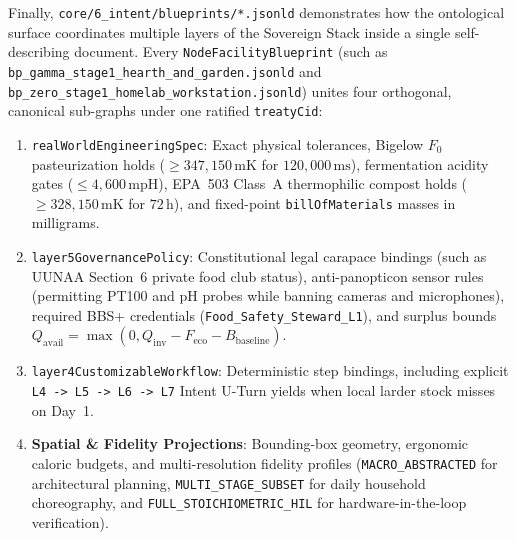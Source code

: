 Finally, \texttt{core/6\_intent/blueprints/*.jsonld} demonstrates how the ontological surface coordinates multiple layers of the Sovereign Stack inside a single self-describing document. Every \texttt{NodeFacilityBlueprint} (such as \texttt{bp\_gamma\_stage1\_hearth\_and\_garden.jsonld} and \texttt{bp\_zero\_stage1\_homelab\_workstation.jsonld}) unites four orthogonal, canonical sub-graphs under one ratified \texttt{treatyCid}:
\begin{enumerate}
    \item \texttt{realWorldEngineeringSpec}: Exact physical tolerances, Bigelow $F_0$ pasteurization holds ($\ge 347{,}150\,\mathrm{mK}$ for $120{,}000\,\mathrm{ms}$), fermentation acidity gates ($\le 4{,}600\,\mathrm{mpH}$), EPA~503 Class~A thermophilic compost holds ($\ge 328{,}150\,\mathrm{mK}$ for $72\,\mathrm{h}$), and fixed-point \texttt{billOfMaterials} masses in milligrams.
    \item \texttt{layer5GovernancePolicy}: Constitutional legal carapace bindings (such as UUNAA Section~6 private food club status), anti-panopticon sensor rules (permitting PT100 and pH probes while banning cameras and microphones), required BBS+ credentials (\texttt{Food\_Safety\_Steward\_L1}), and surplus bounds $Q_{\mathrm{avail}} = \max(0, Q_{\mathrm{inv}} - F_{\mathrm{eco}} - B_{\mathrm{baseline}})$.
    \item \texttt{layer4CustomizableWorkflow}: Deterministic step bindings, including explicit \texttt{L4 -> L5 -> L6 -> L7} Intent U-Turn yields when local larder stock misses on Day~1.
    \item \textbf{Spatial \& Fidelity Projections}: Bounding-box geometry, ergonomic caloric budgets, and multi-resolution fidelity profiles (\texttt{MACRO\_ABSTRACTED} for architectural planning, \texttt{MULTI\_STAGE\_SUBSET} for daily household choreography, and \texttt{FULL\_STOICHIOMETRIC\_HIL} for hardware-in-the-loop verification).
\end{enumerate}

